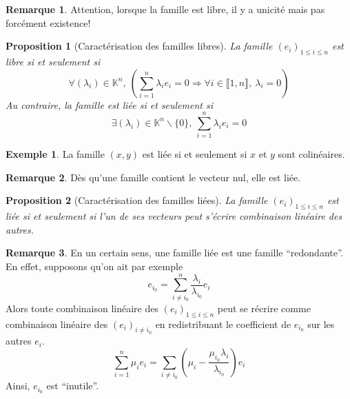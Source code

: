 \documentclass[french]{book}
\theoremstyle{plain}
\newtheorem{prop}{Proposition}[chapter]
\theoremstyle{definition}
\newtheorem{exa}{Exemple}[chapter]
\newtheorem{rmq}{Remarque}[chapter]
\theoremstyle{remark}
\begin{document}
\begin{rmq}
	Attention, lorsque la famille est libre, il y a unicité mais pas forcément existence!
\end{rmq}
\begin{prop}[Caractérisation des familles libres]
	La famille $(e_i)_{1 \leqslant i \leqslant n}$ est libre si et seulement si $$\forall (\lambda_i) \in \mathbb{K}^n,\ \left( \sum_{i=1}^n \lambda_i e_i = 0 \Rightarrow \forall i \in \llbracket1,n\rrbracket,\ \lambda_i = 0 \right)$$
	Au contraire, la famille est liée si et seulement si $$\exists (\lambda_i) \in \mathbb{K}^n \backslash \{0\},\ \sum_{i=1}^n \lambda_i e_i = 0$$
\end{prop}
\begin{exa}
	La famille $(x, y)$ est liée si et seulement si $x$ et $y$ sont colinéaires.
\end{exa}
\begin{rmq}
	Dès qu'une famille contient le vecteur nul, elle est liée.
\end{rmq}
\begin{prop}[Caractérisation des familles liées]
	La famille $(e_i)_{1 \leqslant i \leqslant n}$ est liée si et seulement si l'un de ses vecteurs peut s'écrire combinaison linéaire des autres.
\end{prop}
\begin{rmq}
	En un certain sens, une famille liée est une famille ``redondante''. En effet, supposons qu'on ait par exemple $$e_{i_0} = \sum_{i \neq i_0}^{n} \frac{\lambda_i}{\lambda_{i_0}} e_i$$
Alors toute combinaison linéaire des $(e_i)_{1 \leqslant i \leqslant n}$ peut se récrire comme combinaison linéaire des $(e_i)_{i \neq i_0}$ en redistribuant le coefficient de $e_{i_0}$ sur les autres $e_i$.$$\sum_{i=1}^{n} \mu_i e_i = \sum_{i \neq i_0} \left(\mu_i - \frac{\mu_{i_0} \lambda_i}{\lambda_{i_0}}\right) e_i$$
Ainsi, $e_{i_0}$ est ``inutile''.
\end{rmq}
\end{document}
